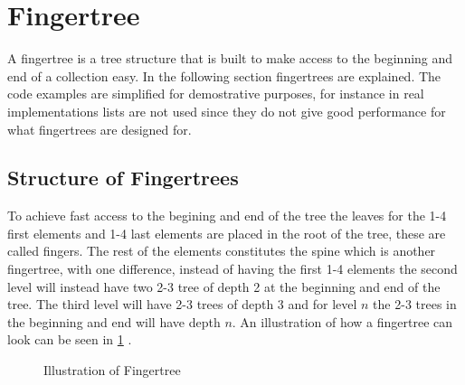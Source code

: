 \newpage

\section{Fingertree}
A fingertree is a tree structure that is built to make access to the beginning
and end of a collection easy. In the following section fingertrees are
explained. The code examples are simplified for demostrative purposes, for
instance in real implementations lists are not used since they do not give good
performance for what fingertrees are designed for.

\subsection{Structure of Fingertrees}
To achieve fast access to the begining and end of the tree the leaves for the
1-4 first elements and 1-4 last elements are placed in the root of the tree,
these are called fingers. The rest of
the elements constitutes the spine which is another fingertree, with one
difference, instead of having the first 1-4 elements the second level will
instead have two 2-3 tree of depth 2 at the beginning and end of the tree. The
third level will have 2-3 trees of depth 3 and for level $n$ the 2-3 trees in
the beginning and end will have depth $n$. An illustration of how a fingertree
can look can be seen in \cref{fig:fingertree} \cite{fingertree}.

\begin{figure}[!h]
\centering
{} 
\caption{Illustration of Fingertree \label{fig:fingertree}}
\end{figure}

